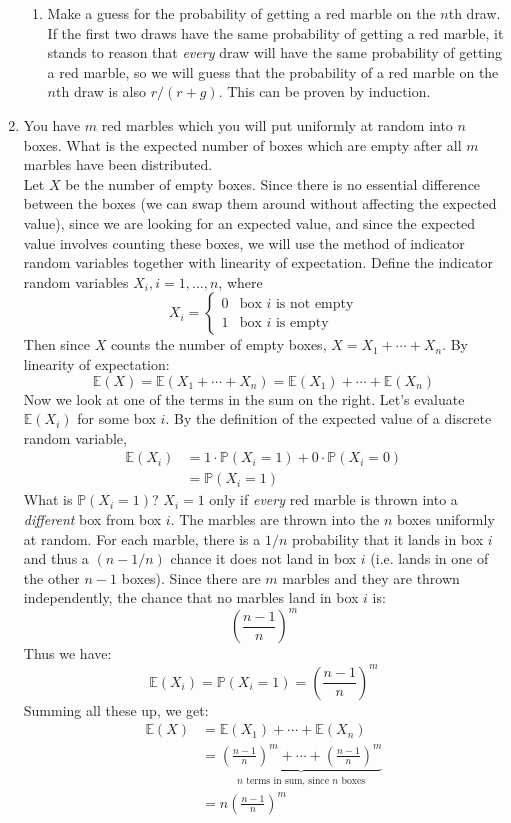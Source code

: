 \documentclass[12pt]{article}
\def\P{{\mathbb P}}
\def\E{{\mathbb E}}
\begin{document}
\begin{enumerate}
\begin{enumerate}
\item Make a guess for the probability of getting a red marble on the $n$th draw.\\

If the first two draws have the same probability of getting a red marble, it stands to reason that \emph{every} draw will have the same probability of getting a red marble, so we will guess that the probability of a red marble on the $n$th draw is also $r / (r + g)$. This can be proven by induction.
\end{enumerate}

\item You have $m$ red marbles which you will put uniformly at random into $n$ boxes. What is the expected number of boxes which are empty after all $m$ marbles have been distributed. \\

Let $X$ be the number of empty boxes. Since there is no essential difference between the boxes (we can swap them around without affecting the expected value), since we are looking for an expected value, and since the expected value involves counting these boxes, we will use the method of indicator random variables together with linearity of expectation. Define the indicator random variables $X_i, i = 1, \dots, n$, where
\[
X_i = \begin{cases}
0 & \text{box $i$ is not empty}\\
1 & \text{box $i$ is empty}
\end{cases}
\]
Then since $X$ counts the number of empty boxes, $X = X_1 + \cdots + X_n$. By linearity of expectation:
\[
\E(X) = \E(X_1 + \cdots + X_n) = \E(X_1) + \cdots + \E(X_n)
\]
Now we look at one of the terms in the sum on the right. Let's evaluate $\E(X_i)$ for some box $i$. By the definition of the expected value of a discrete random variable,
\begin{align*}
\E(X_i) &= 1 \cdot \P(X_i = 1) + 0 \cdot \P(X_i = 0) \\
&= \P(X_i = 1)
\end{align*}
What is $\P(X_i = 1)$? $X_i = 1$ only if \emph{every} red marble is thrown into a \emph{different} box from box $i$. The marbles are thrown into the $n$ boxes uniformly at random. For each marble, there is a $1/n$ probability that it lands in box $i$ and thus a $(n-1/n)$ chance it does not land in box $i$ (i.e. lands in one of the other $n-1$ boxes). Since there are $m$ marbles and they are thrown independently, the chance that no marbles land in box $i$ is:
\[
\left(\frac{n-1}{n}\right)^m
\]
Thus we have:
\[
\E(X_i) = \P(X_i = 1) = \left(\frac{n-1}{n}\right)^m
\]
Summing all these up, we get:
\begin{align*}
\E(X) &= \E(X_1) + \cdots + \E(X_n) \\
&= \underbrace{ \left(\frac{n-1}{n}\right)^m + \cdots + \left(\frac{n-1}{n}\right)^m }_{\text{$n$ terms in sum, since $n$ boxes}} \\
&= n \left(\frac{n-1}{n}\right)^m 
\end{align*}


\end{enumerate}
\end{document}
